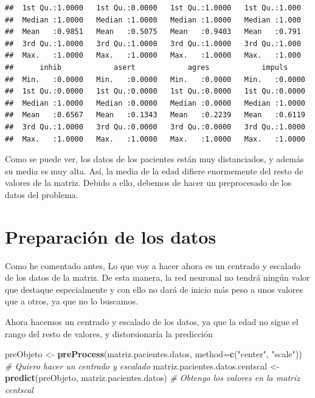 \documentclass[]{article}
\newenvironment{Shaded}{\begin{snugshade}}{\end{snugshade}}
\newcommand{\CommentTok}[1]{\textcolor[rgb]{0.56,0.35,0.01}{\textit{#1}}}
\newcommand{\DataTypeTok}[1]{\textcolor[rgb]{0.13,0.29,0.53}{#1}}
\newcommand{\KeywordTok}[1]{\textcolor[rgb]{0.13,0.29,0.53}{\textbf{#1}}}
\newcommand{\NormalTok}[1]{#1}
\newcommand{\StringTok}[1]{\textcolor[rgb]{0.31,0.60,0.02}{#1}}
\begin{document}
\begin{verbatim}
##  1st Qu.:1.0000   1st Qu.:0.0000   1st Qu.:1.0000   1st Qu.:1.000  
##  Median :1.0000   Median :1.0000   Median :1.0000   Median :1.000  
##  Mean   :0.9851   Mean   :0.5075   Mean   :0.9403   Mean   :0.791  
##  3rd Qu.:1.0000   3rd Qu.:1.0000   3rd Qu.:1.0000   3rd Qu.:1.000  
##  Max.   :1.0000   Max.   :1.0000   Max.   :1.0000   Max.   :1.000  
##      inhib            asert            agres            impuls      
##  Min.   :0.0000   Min.   :0.0000   Min.   :0.0000   Min.   :0.0000  
##  1st Qu.:0.0000   1st Qu.:0.0000   1st Qu.:0.0000   1st Qu.:0.0000  
##  Median :1.0000   Median :0.0000   Median :0.0000   Median :1.0000  
##  Mean   :0.6567   Mean   :0.1343   Mean   :0.2239   Mean   :0.6119  
##  3rd Qu.:1.0000   3rd Qu.:0.0000   3rd Qu.:0.0000   3rd Qu.:1.0000  
##  Max.   :1.0000   Max.   :1.0000   Max.   :1.0000   Max.   :1.0000
\end{verbatim}

Como se puede ver, los datos de los pacientes están muy distanciados, y
además su media es muy alta. Así, la media de la edad difiere
enormemente del resto de valores de la matriz. Debido a ello, debemos de
hacer un preprocesado de los datos del problema.

\hypertarget{preparacion-de-los-datos}{%
\section{Preparación de los datos}\label{preparacion-de-los-datos}}

Como he comentado antes, Lo que voy a hacer ahora es un centrado y
escalado de los datos de la matriz. De esta manera, la red neuronal no
tendrá ningún valor que destaque especialmente y con ello no dará de
inicio más peso a unos valores que a otros, ya que no lo buscamos.

Ahora hacemos un centrado y escalado de los datos, ya que la edad no
sigue el rango del resto de valores, y distorsionaría la predicción

\begin{Shaded}
\begin{Highlighting}[]
\NormalTok{preObjeto <-}\StringTok{ }\KeywordTok{preProcess}\NormalTok{(matriz.pacientes.datos, }\DataTypeTok{method=}\KeywordTok{c}\NormalTok{(}\StringTok{"center"}\NormalTok{, }\StringTok{"scale"}\NormalTok{))  }\CommentTok{# Quiero hacer un centrado y escalado}
\NormalTok{matriz.pacientes.datos.centscal <-}\StringTok{ }\KeywordTok{predict}\NormalTok{(preObjeto, matriz.pacientes.datos) }\CommentTok{# Obtengo los valores en la matriz centscal}
\end{Highlighting}
\end{Shaded}
\end{document}
